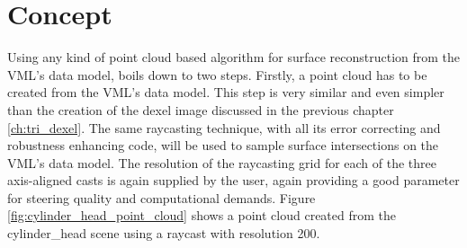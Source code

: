 \section{Concept}
\label{sec:point_cloud_concept}

Using any kind of point cloud based algorithm for surface reconstruction from the VML's data model, boils down to two steps.
Firstly, a point cloud has to be created from the VML's data model.
This step is very similar and even simpler than the creation of the dexel image discussed in the previous chapter \ref{ch:tri_dexel}.
The same raycasting technique, with all its error correcting and robustness enhancing code, will be used to sample surface intersections on the VML's data model.
The resolution of the raycasting grid for each of the three axis-aligned casts is again supplied by the user, again providing a good parameter for steering quality and computational demands.
Figure \ref{fig:cylinder_head_point_cloud} shows a point cloud created from the cylinder\_head scene using a raycast with resolution 200.
%
